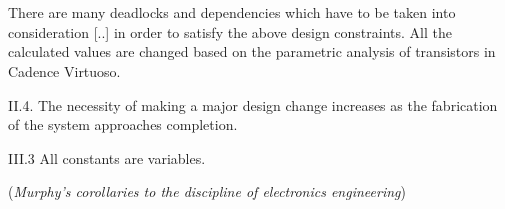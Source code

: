 \section*{}
\begin{flushright}
	There are many deadlocks and
	dependencies which have to be taken into consideration [..] in order to satisfy the above design constraints. All the calculated
	values are changed based on the parametric analysis of transistors in Cadence Virtuoso.
\end{flushright}
\begin{flushright}
	II.4. The necessity of making a major design change increases as the fabrication of the system approaches completion.
\end{flushright}
\begin{flushright}
	III.3 All constants are variables.
\end{flushright}
\begin{flushright}
	(\textit{Murphy's corollaries to the discipline of electronics engineering})
\end{flushright}